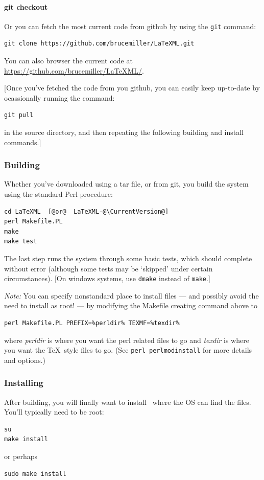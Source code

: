 \documentclass{article}
\begin{document}
\paragraph{git checkout}\label{source.git}
Or you can fetch the most current code from github by using the \texttt{git} command:
\begin{lstlisting}[style=shell]
git clone https://github.com/brucemiller/LaTeXML.git
\end{lstlisting}
You can also browser the current code at \url{https://github.com/brucemiller/LaTeXML/}.

[Once you've fetched the code from you github, you can easily keep up-to-date
by ocassionally running the command:
\begin{lstlisting}[style=shell]
git pull
\end{lstlisting}
in the source directory, and then repeating the following building and install commands.]

\subsubsection{Building}\label{build.source}
Whether you've downloaded using a tar file, or from git,
you build the system using the standard Perl procedure:
\begin{lstlisting}[style=shell]
cd LaTeXML  [@or@  LaTeXML-@\CurrentVersion@]
perl Makefile.PL
make
make test
\end{lstlisting}
The last step runs the system through some basic tests,
which should complete without error (although some tests may be `skipped'
under certain circumstances).
[On windows systems, use \texttt{dmake} instead of \texttt{make}.]

\emph{Note:} You can specify nonstandard place to install files
--- and possibly avoid the need to install as root! ---
by modifying the Makefile creating command above to
\begin{lstlisting}[style=shell]
perl Makefile.PL PREFIX=%perldir% TEXMF=%texdir%
\end{lstlisting}
where \emph{perldir} is where you want the perl related files to go and
\emph{texdir} is where you want the \TeX\ style files to go.
(See \texttt{perl perlmodinstall} for more details and options.)

\subsubsection{Installing}\label{install.source}
After building, you will finally want to install \LaTeXML\
where the OS can find the files.  You'll typically need to be root:
\begin{lstlisting}[style=shell]
su
make install
\end{lstlisting}
or perhaps
\begin{lstlisting}[style=shell]
sudo make install
\end{lstlisting}
\end{document}
